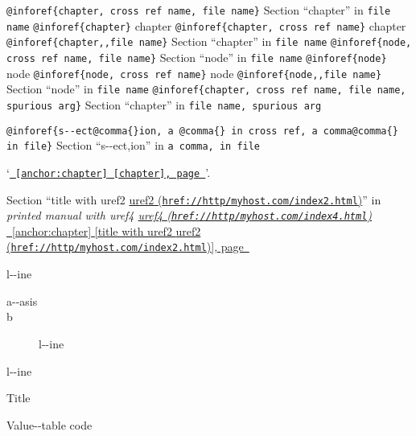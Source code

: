 \documentclass{book}
\begin{document}
\texttt{@inforef\{chapter, cross ref name, file name\}} Section ``chapter'' in \texttt{file name}
\texttt{@inforef\{chapter\}} chapter
\texttt{@inforef\{chapter, cross ref name\}} chapter
\texttt{@inforef\{chapter,,file name\}} Section ``chapter'' in \texttt{file name}
\texttt{@inforef\{node, cross ref name, file name\}} Section ``node'' in \texttt{file name}
\texttt{@inforef\{node\}} node
\texttt{@inforef\{node, cross ref name\}} node
\texttt{@inforef\{node,,file name\}} Section ``node'' in \texttt{file name}
\texttt{@inforef\{chapter, cross ref name, file name, spurious arg\}} Section ``chapter'' in \texttt{file name, spurious arg}

\texttt{@inforef\{s{-}{-}ect@comma\{\}ion, a @comma\{\} in cross
ref, a comma@comma\{\} in file\}}
Section ``s{-}{-}ect,ion'' in \texttt{a comma, in file}

`\texttt{\hyperref[anchor:chapter]{\chaptername~\ref*{anchor:chapter} [chapter], page~\pageref*{anchor:chapter}}}'.

Section ``title with uref2 \href{href://http/myhost.com/index2.html}{uref2 (\nolinkurl{href://http/myhost.com/index2.html})}'' in \textit{printed manual with uref4 \href{href://http/myhost.com/index4.html}{uref4 (\nolinkurl{href://http/myhost.com/index4.html})}}
\hyperref[anchor:chapter]{\chaptername~\ref*{anchor:chapter} [title with uref2 \href{href://http/myhost.com/index2.html}{uref2 (\nolinkurl{href://http/myhost.com/index2.html})}], page~\pageref*{anchor:chapter}}

\begin{description}[format=\textbf]
\item[a{-}{-}strong]
l{-}{-}ine
\end{description}

\begin{description}
\item[a{-}{-}asis]
%
\item[b]
%
l{-}{-}ine
\end{description}

\begin{description}[format=\normalfont\emph]
\item[a]
%
%
\item[b]
%
l{-}{-}ine
\end{description}

\begin{description}[format=\texttt]
\item[] Title
\item[a{-}{-}code]
Value{-}{-}table code
\end{description}
\end{document}
